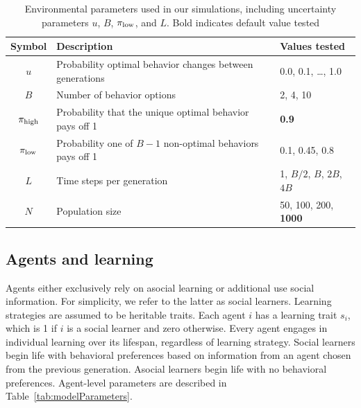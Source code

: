 \documentclass[letterpaper,11.5pt]{scrartcl}
\begin{document}
\vspace{2em}
\begin{table}[h]
\caption{Environmental parameters used in our simulations, including uncertainty parameters $u$, $B$,
$\pi_{\mathrm{low}}$, and $L$. Bold indicates default value tested} %
    \label{tab:uncertaintyParameters}
    \centering %
    \begin{tabular}{cp{4.0in}p{1.25in}} \toprule

        Symbol & Description & Values tested \\ 

        \midrule  

        $u$    & Probability optimal behavior changes between generations 
               & 0.0, 0.1, \ldots, 1.0 \\

        $B$       & Number of behavior options
                  & 2, 4, 10 \\

        $\pi_{\mathrm{high}}$ & Probability that the unique optimal behavior pays off 1 
                & \textbf{0.9} \\

        $\pi_{\mathrm{low}}$ & Probability one of $B - 1$ non-optimal behaviors pays off 1 
                 & 0.1, 0.45, 0.8 \\ 

        $L$    & Time steps per generation & 1, $B/2$, $B$, $2B$, $4B$ \\

        $N$    & Population size
                 & 50, 100, 200, \textbf{1000} \\
               
        \bottomrule
        \end{tabular} 
\end{table}



\subsection{Agents and learning}

Agents either exclusively rely on asocial learning or additional use social information. For simplicity, we refer to the latter as social learners. Learning strategies are assumed to be heritable traits. Each agent $i$ has a learning trait $s_i$, which is 1 if $i$ is a social learner and zero otherwise. Every agent engages in
individual learning over its lifespan, regardless of learning strategy.
Social learners begin life with
behavioral preferences based on information from an agent chosen  from the previous generation. 
Asocial learners begin life with no behavioral
preferences. Agent-level parameters are described in Table~\ref{tab:modelParameters}. 
\end{document}

